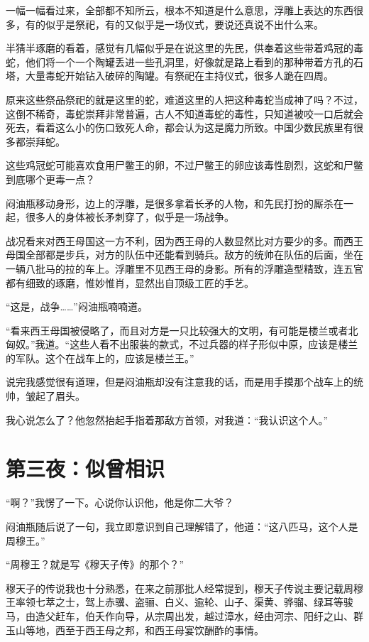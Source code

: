 一幅一幅看过来，全部都不知所云，根本不知道是什么意思，浮雕上表达的东西很多，有的似乎是祭祀，有的又似乎是一场仪式，要说还真说不出什么来。

半猜半琢磨的看着，感觉有几幅似乎是在说这里的先民，供奉着这些带着鸡冠的毒蛇，他们将一个一个陶罐丢进一些孔洞里，好像就是路上看到的那种带着方孔的石塔，大量毒蛇开始钻入破碎的陶罐。有祭祀在主持仪式，很多人跪在四周。

原来这些祭品祭祀的就是这里的蛇，难道这里的人把这种毒蛇当成神了吗？不过，这倒不稀奇，毒蛇崇拜非常普遍，古人不知道毒蛇的毒性，只知道被咬一口后就会死去，看着这么小的伤口致死人命，都会认为这是魔力所致。中国少数民族里有很多都崇拜蛇。

这些鸡冠蛇可能喜欢食用尸鳖王的卵，不过尸鳖王的卵应该毒性剧烈，这蛇和尸鳖到底哪个更毒一点？

闷油瓶移动身形，边上的浮雕，是很多拿着长矛的人物，和先民打扮的厮杀在一起，很多人的身体被长矛刺穿了，似乎是一场战争。

战况看来对西王母国这一方不利，因为西王母的人数显然比对方要少的多。而西王母国全部都是步兵，对方的队伍中还能看到骑兵。敌方的统帅在队伍的后面，坐在一辆八批马的拉的车上。浮雕里不见西王母的身影。所有的浮雕造型精致，连五官都有细致的琢磨，惟妙惟肖，显然出自顶级工匠的手艺。

“这是，战争……”闷油瓶喃喃道。

“看来西王母国被侵略了，而且对方是一只比较强大的文明，有可能是楼兰或者北匈奴。”我道。“这些人看不出服装的款式，不过兵器的样子形似中原，应该是楼兰的军队。这个在战车上的，应该是楼兰王。”

说完我感觉很有道理，但是闷油瓶却没有注意我的话，而是用手摸那个战车上的统帅，皱起了眉头。

我心说怎么了？他忽然抬起手指着那敌方首领，对我道：“我认识这个人。”

\chapter{第三夜：似曾相识}

“啊？”我愣了一下。心说你认识他，他是你二大爷？

闷油瓶随后说了一句，我立即意识到自己理解错了，他道：“这八匹马，这个人是周穆王。”

“周穆王？就是写《穆天子传》的那个？”

穆天子的传说我也十分熟悉，在来之前那批人经常提到，穆天子传说主要记载周穆王率领七萃之士，驾上赤骥、盗骊、白义、逾轮、山子、渠黄、骅骝、绿耳等骏马，由造父赶车，伯夭作向导，从宗周出发，越过漳水，经由河宗、阳纡之山、群玉山等地，西至于西王母之邦，和西王母宴饮酬酢的事情。

